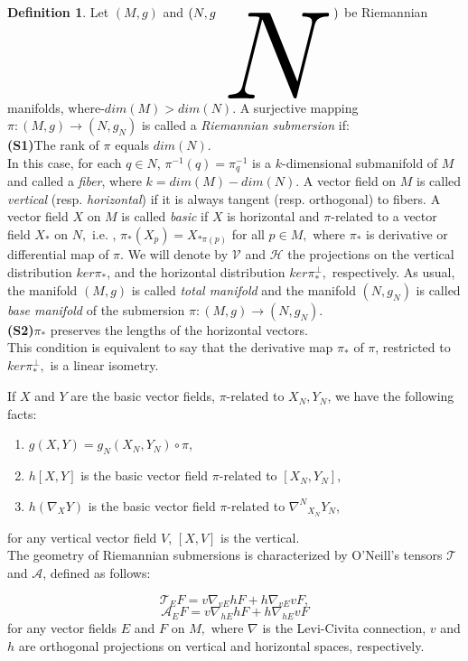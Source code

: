 \documentclass{birkjour}
\theoremstyle{definition}
\newtheorem{definition}[theorem]{Definition}
\theoremstyle{remark}
\numberwithin{equation}{section}
\begin{document}
\begin{definition}\rm
Let $(M,g)$ and $(N,g_{\text{\tiny$N$}})$ be Riemannian manifolds,
where-$dim(M)>dim(N)$. A surjective mapping
$\pi:(M,g)\rightarrow(N,g_{N})$ is called a \emph{Riemannian
	submersion}
\cite{O} if:\\
\textbf{(S1)}\quad The rank of $\pi$ equals $dim(N)$.\\
In this case, for each $q\in N$, $\pi^{-1}(q)=\pi_{q}^{-1}$ is a $k$-dimensional
submanifold of $M$ and called a \emph{fiber}, where $k=dim(M)-dim(N).$
A vector field on $M$ is called \emph{vertical} (resp.
\emph{horizontal}) if it is always tangent (resp. orthogonal) to
fibers. A vector field $X$ on $M$ is called \emph{basic} if $X$ is
horizontal and $\pi$-related to a vector field $X_{*}$ on $N,$ i.e. ,
$\pi_{*}(X_{p})=X_{*\pi(p)}$ for all $p\in M,$ where $\pi_{*}$ is derivative or differential map of $\pi.$
We will denote by $\mathcal{V}$ and $\mathcal{H}$ the projections on the vertical
distribution $ker\pi_{*}$, and the horizontal distribution
$ker\pi_{*}^{\bot},$ respectively. As usual, the manifold $(M,g)$ is called \emph{total manifold} and
the manifold $(N,g_{N})$ is called \emph{base manifold} of the submersion $\pi:(M,g)\rightarrow(N,g_{N})$.\\
\textbf{(S2)}\quad $\pi_{*}$ preserves the lengths of the horizontal vectors.\\
This condition is equivalent to say that the derivative map $\pi_{*}$ of $\pi$, restricted to $ker\pi_{*}^{\bot},$ is a linear
isometry.
\end{definition}
If $X$ and $Y$ are the basic vector fields, $\pi$-related to $X_{N}, Y_{N}$, we have the following facts:
\begin{enumerate}
	\item{} $g(X,Y)=g_{N}(X_{N},Y_{N})\circ\pi$,\\
	\item{} $h[X,Y]$ is the basic vector field $\pi$-related to $[X_{N},Y_{N}]$,\\
	\item{} $h(\nabla_{X}Y)$ is the basic vector field $\pi$-related to ${\nabla^{N}}_{{X}_{N}}Y_{N}$, \\
\end{enumerate}
for any vertical vector field $V$, $[X,V]$ is the vertical.\\
\indent
The geometry of Riemannian
submersions is characterized by O'Neill's tensors $\mathcal{T}$ and
$\mathcal{A}$, defined as follows:

\begin{equation}\label{e1}
\mathcal{T}_{E}F=v\nabla_{vE}hF+h\nabla_{vE}vF,
\end{equation}
\begin{equation}\label{e2}
\mathcal{A}_{E}F=v\nabla_{hE}hF+h\nabla_{hE}vF
\end{equation}
for any vector fields $E$ and $F$ on $M,$ where $\nabla$ is the
Levi-Civita connection, $v$ and  $h$ are orthogonal projections on vertical and horizontal spaces, respectively.
\end{document}
